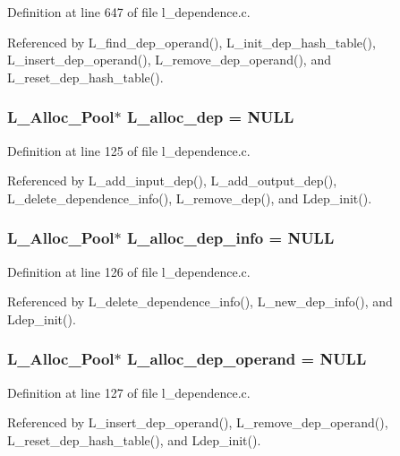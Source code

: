 Definition at line 647 of file l\_\-dependence.c.

Referenced by L\_\-find\_\-dep\_\-operand(), L\_\-init\_\-dep\_\-hash\_\-table(), L\_\-insert\_\-dep\_\-operand(), L\_\-remove\_\-dep\_\-operand(), and L\_\-reset\_\-dep\_\-hash\_\-table().
\subsubsection{\setlength{\rightskip}{0pt plus 5cm}\bf{L\_\-Alloc\_\-Pool}$\ast$ \bf{L\_\-alloc\_\-dep} = \bf{NULL}}\label{l__dependence_8c_3859244e82b54cb81afa9f544e4888bf}




Definition at line 125 of file l\_\-dependence.c.

Referenced by L\_\-add\_\-input\_\-dep(), L\_\-add\_\-output\_\-dep(), L\_\-delete\_\-dependence\_\-info(), L\_\-remove\_\-dep(), and Ldep\_\-init().
\subsubsection{\setlength{\rightskip}{0pt plus 5cm}\bf{L\_\-Alloc\_\-Pool}$\ast$ \bf{L\_\-alloc\_\-dep\_\-info} = \bf{NULL}}\label{l__dependence_8c_8ce30600dd67f67c1bf167af09a82fb6}




Definition at line 126 of file l\_\-dependence.c.

Referenced by L\_\-delete\_\-dependence\_\-info(), L\_\-new\_\-dep\_\-info(), and Ldep\_\-init().
\subsubsection{\setlength{\rightskip}{0pt plus 5cm}\bf{L\_\-Alloc\_\-Pool}$\ast$ \bf{L\_\-alloc\_\-dep\_\-operand} = \bf{NULL}}\label{l__dependence_8c_c0a99059945c7d5000cdec3cbcf66183}




Definition at line 127 of file l\_\-dependence.c.

Referenced by L\_\-insert\_\-dep\_\-operand(), L\_\-remove\_\-dep\_\-operand(), L\_\-reset\_\-dep\_\-hash\_\-table(), and Ldep\_\-init().
